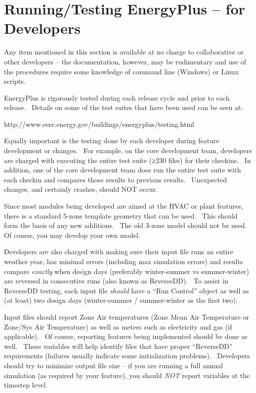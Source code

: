 \chapter{Running/Testing EnergyPlus -- for Developers}\label{runningtesting-energyplus-for-developers}

Any item mentioned in this section is available at no charge to collaborative or other developers -- the documentation, however, may be rudimentary and use of the procedures require some knowledge of command line (Windows) or Linux scripts.

EnergyPlus is rigorously tested during each release cycle and prior to each release.~ Details on some of the test suites that have been used can be seen at:

http://www.eere.energy.gov/buildings/energyplus/testing.html

Equally important is the testing done by each developer during feature development or changes.~ For example, on the core development team, developers are charged with executing the entire test suite (≥230 files) for their checkins.~ In addition, one of the core development team does run the entire test suite with each checkin and compares those results to previous results.~ Unexpected changes, and certainly crashes, should NOT occur.

Since most modules being developed are aimed at the HVAC or plant features, there is a standard 5-zone template geometry that can be used.~ This should form the basis of any new additions.~ The old 3-zone model should not be used.~ Of course, you may develop your own model.

Developers are also charged with making sure their input file runs an entire weather year, has minimal errors (including max simulation errors) and results compare \emph{exactly} when design days (preferably winter-summer vs summer-winter) are reversed in consecutive runs (also known as ReverseDD).~ To assist in ReverseDD testing, each input file \emph{should} have a ``Run Control'' object as well as (at least) two design days (winter-summer / summer-winter as the first two).

Input files should report Zone Air temperatures (Zone Mean Air Temperature or Zone/Sys Air Temperature) as well as meters such as electricity and gas (if applicable).~ Of course, reporting features being implemented should be done as well.~ These variables will help identify files that have proper ``ReverseDD'' requirements (failures usually indicate some initialization problems).~ Developers should try to minimize output file size -- if you are running a full annual simulation (as required by your feature), you should \emph{NOT} report variables at the timestep level.

